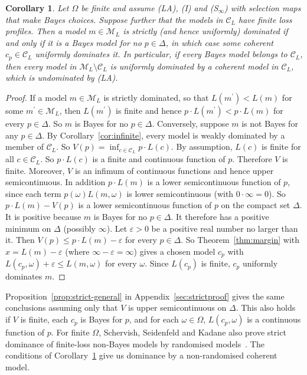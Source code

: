\documentclass[11pt]{article}
\newtheorem{corollary}[theorem]{Corollary}
\theoremstyle{definition}
\theoremstyle{remark}
\newcommand{\M}{\mathcal M}
\newcommand{\C}{\mathcal C}
\begin{document}
\begin{corollary}\label{cor:strict}
Let $\Omega$ be finite and assume (LA), (I) and (S$_\infty$) with selection maps that make Bayes choices.  Suppose further that the models in $\C_L$ have finite loss profiles. Then a model $m\in\M_L$ is strictly (and hence uniformly) dominated if and only if it is a Bayes model for no $p\in\Delta$, in which case some coherent $c_p\in\C_L$ uniformly dominates it. In particular, if every Bayes model belongs to $\C_L$, then every model in $\M_L\setminus\C_L$ is uniformly dominated by a coherent model in $\C_L$, which is undominated by (LA).
\end{corollary}
\begin{proof}
If a model $m\in\M_L$ is strictly dominated, so that $L(m^\prime)<L(m)$ for some $m^\prime\in\M_L$, then $L(m^\prime)$ is finite and hence $p\cdot L(m^\prime)<p\cdot L(m)$ for every $p\in\Delta$. So $m$ is Bayes for no $p\in\Delta$. Conversely, suppose $m$ is not Bayes for any $p\in\Delta$. By Corollary~\ref{cor:infinite}, every model is weakly dominated by a member of $\C_L$. So $V(p)=\inf_{c\in\C_L}p\cdot L(c)$. By assumption, $L(c)$ is finite for all $c\in\C_L$. So $p\cdot L(c)$ is a finite and continuous function of $p$. Therefore $V$ is finite. Moreover, $V$ is an infimum of continuous functions and hence upper semicontinuous. In addition $p\cdot L(m)$ is a lower semicontinuous function of $p$, since each term $p(\omega) L(m,\omega)$ is lower semicontinuous (with $0\cdot\infty=0$). So $p\cdot L(m)-V(p)$ is a lower semicontinuous function of $p$ on the compact set $\Delta$. It is positive because $m$ is Bayes for no $p\in\Delta$. It therefore has a positive minimum on $\Delta$ (possibly $\infty$). Let $\varepsilon>0$ be a positive real number no larger than it. Then $V(p)\le p\cdot L(m)-\varepsilon$ for every $p\in\Delta$. So Theorem~\ref{thm:margin} with $x=L(m)-\varepsilon$ (where $\infty-\varepsilon=\infty$) gives a chosen model $c_p$ with $L(c_p,\omega)+\varepsilon\le L(m,\omega)$ for every $\omega$. Since $L(c_p)$ is finite, $c_p$ uniformly dominates $m$.
\end{proof}
Proposition~\ref{prop:strict-general} in Appendix~\ref{sec:strictproof} gives the same conclusions assuming only that $V$ is upper semicontinuous on $\Delta$. This also holds if $V$ is finite, each $c_p$ is Bayes for $p$, and for each $\omega\in\Omega$, $L(c_p,\omega)$ is a continuous function of $p$.
For finite $\Omega$, Schervish, Seidenfeld and Kadane also prove strict dominance of finite-loss non-Bayes models by randomised models~\cite[Theorem~7]{SSK09}. The conditions of Corollary~\ref{cor:strict} give us dominance by a non-randomised coherent model. 
\end{document}
